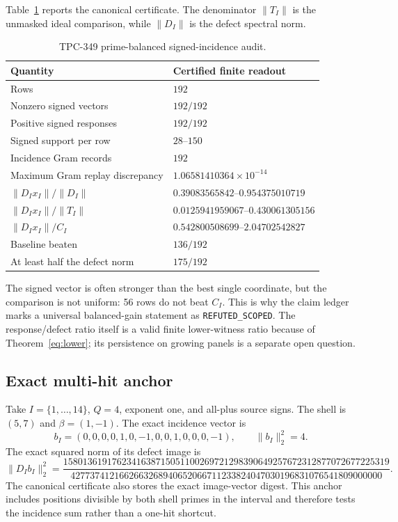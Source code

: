 \documentclass[10pt]{article}
\begin{document}
Table~\ref{tab:summary} reports the canonical certificate.  The denominator
$\|T_I\|$ is the unmasked ideal comparison, while $\|D_I\|$ is the defect
spectral norm.

\begin{table}[t]
\centering
\small
\caption{TPC-349 prime-balanced signed-incidence audit.}
\label{tab:summary}
\begin{tabular}{@{}ll@{}}
\toprule
Quantity & Certified finite readout\\
\midrule
Rows & $192$\\
Nonzero signed vectors & $192/192$\\
Positive signed responses & $192/192$\\
Signed support per row & $28$--$150$\\
Incidence Gram records & $192$\\
Maximum Gram replay discrepancy & $1.06581410364\times10^{-14}$\\
$\|D_Ix_I\|/\|D_I\|$ & $0.39083565842$--$0.954375010719$\\
$\|D_Ix_I\|/\|T_I\|$ & $0.0125941959067$--$0.430061305156$\\
$\|D_Ix_I\|/C_I$ & $0.542800508699$--$2.04702542827$\\
Baseline beaten & $136/192$\\
At least half the defect norm & $175/192$\\
\bottomrule
\end{tabular}
\end{table}

The signed vector is often stronger than the best single coordinate, but the
comparison is not uniform: 56 rows do not beat $C_I$.  This is why the claim
ledger marks a universal balanced-gain statement as \texttt{REFUTED\_SCOPED}.
The response/defect ratio itself is a valid finite lower-witness ratio because
of Theorem~\ref{eq:lower}; its persistence on growing panels is a separate
open question.

\subsection{Exact multi-hit anchor}

Take $I=\{1,\ldots,14\}$, $Q=4$, exponent one, and all-plus source signs.  The
shell is $(5,7)$ and $\beta=(1,-1)$.  The exact incidence vector is
\[
 b_I=(0,0,0,0,1,0,-1,0,0,1,0,0,0,-1),
 \qquad \|b_I\|_2^2=4.
\]
The exact squared norm of its defect image is
\[
 \|D_Ib_I\|_2^2=
 \frac{1580136191762341638715051100269721298390649257672312877072677225319}
 {4277374121662663268940652066711233824047030196831076541809000000}.
\]
The canonical certificate also stores the exact image-vector digest.  This
anchor includes positions divisible by both shell primes in the interval and
therefore tests the incidence sum rather than a one-hit shortcut.
\end{document}
